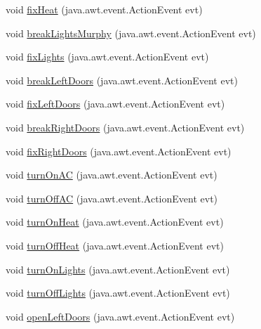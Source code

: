 \begin{DoxyCompactItemize}
void \hyperlink{classTrainControllerComps_1_1TCTestConsole_a7567377a01ddf6773ee63a59f1f2fa24}{fix\+Heat} (java.\+awt.\+event.\+Action\+Event evt)
\item 
void \hyperlink{classTrainControllerComps_1_1TCTestConsole_ac653a53d3cf8290b2961434444b54295}{break\+Lights\+Murphy} (java.\+awt.\+event.\+Action\+Event evt)
\item 
void \hyperlink{classTrainControllerComps_1_1TCTestConsole_ad3e1912c4e49eaf33bf4ddaba7e1f090}{fix\+Lights} (java.\+awt.\+event.\+Action\+Event evt)
\item 
void \hyperlink{classTrainControllerComps_1_1TCTestConsole_a86123ba20ca1fbf0585820d0e314ea0e}{break\+Left\+Doors} (java.\+awt.\+event.\+Action\+Event evt)
\item 
void \hyperlink{classTrainControllerComps_1_1TCTestConsole_a074530680797980a0a59b89fd0825854}{fix\+Left\+Doors} (java.\+awt.\+event.\+Action\+Event evt)
\item 
void \hyperlink{classTrainControllerComps_1_1TCTestConsole_a58698a92444753ab9cf65df4eecbe23c}{break\+Right\+Doors} (java.\+awt.\+event.\+Action\+Event evt)
\item 
void \hyperlink{classTrainControllerComps_1_1TCTestConsole_aee30c912e6a071ea979f0629c5ad7f74}{fix\+Right\+Doors} (java.\+awt.\+event.\+Action\+Event evt)
\item 
void \hyperlink{classTrainControllerComps_1_1TCTestConsole_a2accf7ef6ebf4cc4014be09693138a57}{turn\+On\+AC} (java.\+awt.\+event.\+Action\+Event evt)
\item 
void \hyperlink{classTrainControllerComps_1_1TCTestConsole_a8350577198661578c091f8ae9f299ad4}{turn\+Off\+AC} (java.\+awt.\+event.\+Action\+Event evt)
\item 
void \hyperlink{classTrainControllerComps_1_1TCTestConsole_a7c9c0b19b82810b0b81f8405219e9ccb}{turn\+On\+Heat} (java.\+awt.\+event.\+Action\+Event evt)
\item 
void \hyperlink{classTrainControllerComps_1_1TCTestConsole_a37a58178270fbb1e271fd6d71a32313b}{turn\+Off\+Heat} (java.\+awt.\+event.\+Action\+Event evt)
\item 
void \hyperlink{classTrainControllerComps_1_1TCTestConsole_aa5f62334d031ea47f3275163b3042a96}{turn\+On\+Lights} (java.\+awt.\+event.\+Action\+Event evt)
\item 
void \hyperlink{classTrainControllerComps_1_1TCTestConsole_a1c52342312cab4d62b86bf4a52652703}{turn\+Off\+Lights} (java.\+awt.\+event.\+Action\+Event evt)
\item 
void \hyperlink{classTrainControllerComps_1_1TCTestConsole_a9e6b04de1514fc659dbf665a3dd1cf3d}{open\+Left\+Doors} (java.\+awt.\+event.\+Action\+Event evt)

\end{DoxyCompactItemize}
